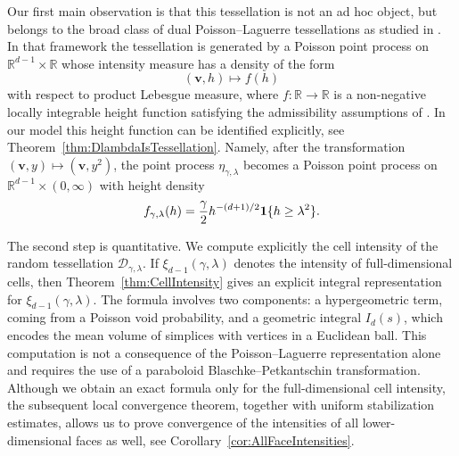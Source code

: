 \documentclass[11pt,a4paper]{article}
\theoremstyle{plain}
\theoremstyle{definition}
\theoremstyle{remark}
\newcommand{\bv}{\boldsymbol{v}}
\def\RR{\mathbb{R}}
\def\cD{\mathcal{D}}
\begin{document}
Our first main observation is that this tessellation is not an ad hoc
object, but belongs to the broad class of dual Poisson--Laguerre
tessellations as studied in \cite{GiWL}. In that framework the tessellation
is generated by a Poisson point process on $\RR^{d-1}\times\RR$ whose
intensity measure has a density of the form
\[
	(\bv,h)\mapsto f(h)
\]
with respect to product Lebesgue measure, where $f:\RR\to\RR$ is a non-negative
locally integrable height function satisfying the admissibility assumptions
of \cite[Definition~3.4]{GiWL}. In our model this height function can be
identified explicitly, see Theorem~\ref{thm:DlambdaIsTessellation}. Namely, after the transformation $(\bv,y)\mapsto(\bv,y^2)$,
the point process $\eta_{\gamma,\lambda}$ becomes a Poisson point process
on $\RR^{d-1}\times(0,\infty)$ with height density
\[
	f_{\gamma,\lambda}(h)
	=
	\frac{\gamma}{2}h^{-(d+1)/2}{\bf 1}\{h\ge\lambda^2\}.
\]

The second step is quantitative. We compute explicitly the cell intensity of
the random tessellation $\cD_{\gamma,\lambda}$. If
$\xi_{d-1}(\gamma,\lambda)$ denotes the intensity of full-dimensional
cells, then
Theorem~\ref{thm:CellIntensity} gives an explicit integral representation
for $\xi_{d-1}(\gamma,\lambda)$. The formula involves two components: a hypergeometric term, coming from a
Poisson void probability, and a geometric integral $I_d(s)$, which
encodes the mean volume of simplices with vertices in a Euclidean ball.
This computation is not a consequence of the Poisson--Laguerre
representation alone and requires the use of a paraboloid
Blaschke--Petkantschin transformation. Although we obtain an exact formula
only for the full-dimensional cell intensity, the subsequent local
convergence theorem, together with uniform stabilization estimates, allows
us to prove convergence of the intensities of all lower-dimensional faces
as well, see Corollary~\ref{cor:AllFaceIntensities}.
\end{document}
